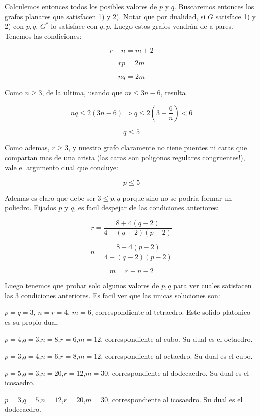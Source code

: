 \documentclass{article}
\begin{document}
Calculemos entonces todos los posibles valores de $p$ y $q$. Buscaremos entonces los grafos planares que satisfacen 1) y 2). Notar que por
dualidad, si $G$ satisface 1) y 2) con $p,q$, $G^*$ lo satisface con $q,p$. Luego estos grafos vendrán de a pares. Tenemos las condiciones:

$$r+n = m+2$$

$$rp = 2m$$

$$nq = 2m$$

Como $n \geq 3$, de la ultima, usando que $m \leq 3n - 6$, resulta

$$nq \leq 2(3n - 6) \Rightarrow q \leq 2 \left (3 - \frac{6}{n} \right ) < 6$$

$$q \leq 5$$

Como ademas, $r \geq 3$, y nuestro grafo claramente no tiene puentes ni caras que compartan mas de una arista (las caras son poligonos regulares
congruentes!), vale el argumento dual que concluye:

$$p \leq 5$$

Ademas es claro que debe ser $3 \leq p,q$ porque sino no se podria formar un poliedro. Fijados $p$ y $q$, es facil despejar de las condiciones
anteriores:

$$r = \frac{8 + 4(q-2)}{4 - (q-2)(p-2)}$$

$$n = \frac{8 + 4(p-2)}{4 - (q-2)(p-2)}$$

$$m = r + n - 2$$

Luego tenemos que probar solo algunos valores de $p,q$ para ver cuales satisfacen las 3 condiciones anteriores. Es facil ver que las unicas
soluciones son:

$p=q=3$, $n=r=4$, $m=6$, correspondiente al tetraedro. Este solido platonico es su propio dual.

$p=4$,$q=3$,$n=8$,$r=6$,$m=12$, correspondiente al cubo. Su dual es el octaedro.

$p=3$,$q=4$,$n=6$,$r=8$,$m=12$, correspondiente al octaedro. Su dual es el cubo.

$p=5$,$q=3$,$n=20$,$r=12$,$m=30$, correspondiente al dodecaedro. Su dual es el icosaedro.

$p=3$,$q=5$,$n=12$,$r=20$,$m=30$, correspondiente al icosaedro. Su dual es el dodecaedro.
\end{document}
